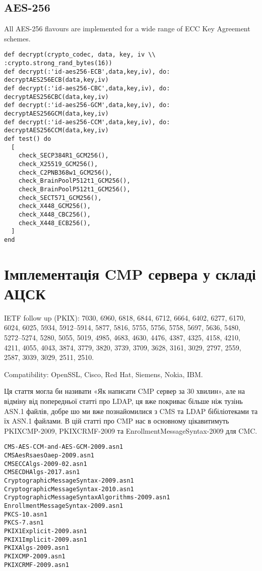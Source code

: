 \newpage
\subsection{AES-256}

All AES-256 flavours are implemented for a wide range of ECC Key Agreement schemes.

\begin{lstlisting}
def decrypt(crypto_codec, data, key, iv \\ :crypto.strong_rand_bytes(16))
def decrypt(:'id-aes256-ECB',data,key,iv), do: decryptAES256ECB(data,key,iv)
def decrypt(:'id-aes256-CBC',data,key,iv), do: decryptAES256CBC(data,key,iv)
def decrypt(:'id-aes256-GCM',data,key,iv), do: decryptAES256GCM(data,key,iv)
def decrypt(:'id-aes256-CCM',data,key,iv), do: decryptAES256CCM(data,key,iv)
def test() do
  [
    check_SECP384R1_GCM256(),
    check_X25519_GCM256(),
    check_C2PNB368w1_GCM256(),
    check_BrainPoolP512t1_GCM256(),
    check_BrainPoolP512t1_GCM256(),
    check_SECT571_GCM256(),
    check_X448_GCM256(),
    check_X448_CBC256(),
    check_X448_ECB256(),
  ]
end
\end{lstlisting}

\newpage
\section{Імплементація CMP сервера у складі АЦСК}

IETF follow up (PKIX): 7030, 6960, 6818, 6844, 6712, 6664, 6402, 6277, 6170, 6024, 6025, 5934, 5912--5914, 5877, 5816, 5755, 5756, 5758, 5697, 5636, 5480, 5272--5274, 5280, 5055, 5019, 4985, 4683, 4630, 4476, 4387, 4325, 4158, 4210, 4211, 4055, 4043, 3874, 3779, 3820, 3739, 3709, 3628, 3161, 3029, 2797, 2559, 2587, 3039, 3029, 2511, 2510.

Compatibility: OpenSSL, Cisco, Red Hat, Siemens, Nokia, IBM.

Ця стаття могла би називати «Як написати CMP сервер за 30 хвилин»,
 але на відміну від попередньої статті про LDAP, ця вже покриває більше ніж тузінь ASN.1 файлів, добре шо ми вже познайомилися з CMS та LDAP бібіліотеками та їх ASN.1 файлами. В цій статті про CMP нас в основному цікавитимуть PKIXCMP-2009, PKIXCRMF-2009 та EnrollmentMessageSyntax-2009 для CMC.

\renewcommand{\footnotesize}{\scriptsize}

\begin{lstlisting}
CMS-AES-CCM-and-AES-GCM-2009.asn1
CMSAesRsaesOaep-2009.asn1
CMSECCAlgs-2009-02.asn1
CMSECDHAlgs-2017.asn1
CryptographicMessageSyntax-2009.asn1
CryptographicMessageSyntax-2010.asn1
CryptographicMessageSyntaxAlgorithms-2009.asn1
EnrollmentMessageSyntax-2009.asn1
PKCS-10.asn1
PKCS-7.asn1
PKIX1Explicit-2009.asn1
PKIX1Implicit-2009.asn1
PKIXAlgs-2009.asn1
PKIXCMP-2009.asn1
PKIXCRMF-2009.asn1
\end{lstlisting}

